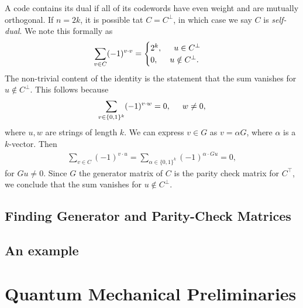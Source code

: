 \documentclass{article}
\theoremstyle{definition}
\begin{document}
A code contains its dual if all of its codewords have even weight and are mutually orthogonal. If $n=2k$, it is possible tat $C = C^\perp$, in which case we say $C$ is \textit{self-dual}. We note this formally as
\begin{align}
\sum_{v\in C}(-1)^{v\cdot v} = \begin{cases}
2^k,\hspace{0.5cm} u\in C^\perp\\
0,\hspace{0.5cm} u\notin C^\perp.
\end{cases}
\end{align}
The non-trivial content of the identity is the statement that the sum vanishes for $u\notin C^\perp$. This follows because
\begin{align}
\sum_{v\in\{0,1\}^k}(-1)^{v\cdot w} = 0, \hspace{0.5cm}w\neq 0,
\end{align}
where $u,w$ are strings of length $k$. We can express $v\in G$ as $v = \alpha G$, where $\alpha$ is a $k$-vector. Then
\begin{align}
\sum_{v\in C}(-1)^{v\cdot u} = \sum_{\alpha \in \{0,1\}^k} (-1)^{\alpha\cdot Gu} = 0,
\end{align}
for $Gu \neq 0$. Since $G$ the generator matrix of $C$ is the parity check matrix for $C^\top$, we conclude that the sum vanishes for $u\notin C^\perp$.





\subsection{Finding Generator and Parity-Check Matrices}

\subsection{An example}



\newpage







\section{Quantum Mechanical Preliminaries}
\newpage
\end{document}
